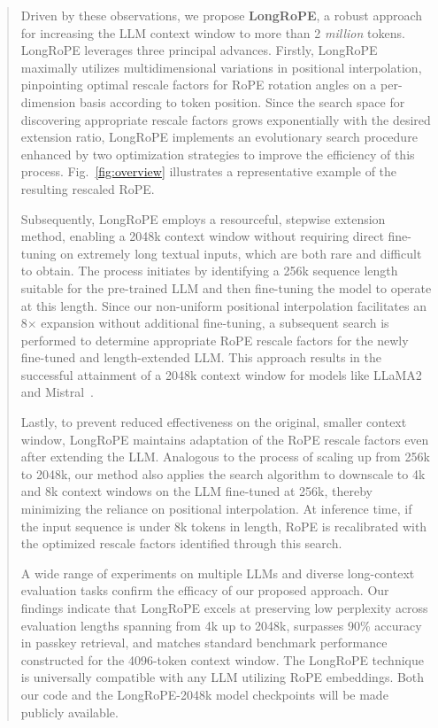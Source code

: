 \begin{abstract}
Driven by these observations, we propose \textbf{LongRoPE}, a robust approach for increasing the LLM context window to more than 2 \emph{million} tokens. LongRoPE leverages three principal advances. Firstly, LongRoPE maximally utilizes multidimensional variations in positional interpolation, pinpointing optimal rescale factors for RoPE rotation angles on a per-dimension basis according to token position. Since the search space for discovering appropriate rescale factors grows exponentially with the desired extension ratio, LongRoPE implements an evolutionary search procedure enhanced by two optimization strategies to improve the efficiency of this process. Fig.~\ref{fig:overview} illustrates a representative example of the resulting rescaled RoPE.

Subsequently, {LongRoPE} employs a resourceful, stepwise extension method, enabling a 2048k context window without requiring direct fine-tuning on extremely long textual inputs, which are both rare and difficult to obtain. The process initiates by identifying a 256k sequence length suitable for the pre-trained LLM and then fine-tuning the model to operate at this length. Since our non-uniform positional interpolation facilitates an 8$\times$ expansion without additional fine-tuning, a subsequent search is performed to determine appropriate RoPE rescale factors for the newly fine-tuned and length-extended LLM. This approach results in the successful attainment of a 2048k context window for models like LLaMA2 and Mistral~\cite{mistral}.

Lastly, to prevent reduced effectiveness on the original, smaller context window, {LongRoPE} maintains adaptation of the RoPE rescale factors even after extending the LLM. Analogous to the process of scaling up from 256k to 2048k, our method also applies the search algorithm to downscale to 4k and 8k context windows on the LLM fine-tuned at 256k, thereby minimizing the reliance on positional interpolation. At inference time, if the input sequence is under 8k tokens in length, RoPE is recalibrated with the optimized rescale factors identified through this search.

A wide range of experiments on multiple LLMs and diverse long-context evaluation tasks confirm the efficacy of our proposed approach. Our findings indicate that LongRoPE excels at preserving low perplexity across evaluation lengths spanning from 4k up to 2048k, surpasses 90\% accuracy in passkey retrieval, and matches standard benchmark performance constructed for the 4096-token context window. The LongRoPE technique is universally compatible with any LLM utilizing RoPE embeddings. Both our code and the LongRoPE-2048k model checkpoints will be made publicly available.


\end{abstract}

